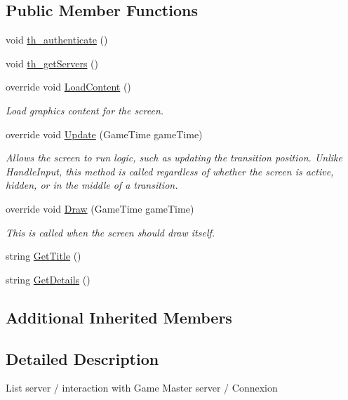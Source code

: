 \subsection*{Public Member Functions}
\begin{DoxyCompactItemize}
\item 
void \hyperlink{classgearit_1_1src_1_1gui_1_1_menu_play_a28597c13b8d65ca1c8ca39fb51b44cec}{th\+\_\+authenticate} ()
\item 
void \hyperlink{classgearit_1_1src_1_1gui_1_1_menu_play_ab941e76740981fb4c6da8fe7bb173134}{th\+\_\+get\+Servers} ()
\item 
override void \hyperlink{classgearit_1_1src_1_1gui_1_1_menu_play_af910914479191ff3c5df9a9371a508dd}{Load\+Content} ()
\begin{DoxyCompactList}\small\item\em Load graphics content for the screen. \end{DoxyCompactList}\item 
override void \hyperlink{classgearit_1_1src_1_1gui_1_1_menu_play_a81c6b64878420e9905deec6038b1804f}{Update} (Game\+Time game\+Time)
\begin{DoxyCompactList}\small\item\em Allows the screen to run logic, such as updating the transition position. Unlike Handle\+Input, this method is called regardless of whether the screen is active, hidden, or in the middle of a transition. \end{DoxyCompactList}\item 
override void \hyperlink{classgearit_1_1src_1_1gui_1_1_menu_play_a5d930bebee9e40d7a74a6427bb028fc5}{Draw} (Game\+Time game\+Time)
\begin{DoxyCompactList}\small\item\em This is called when the screen should draw itself. \end{DoxyCompactList}\item 
string \hyperlink{classgearit_1_1src_1_1gui_1_1_menu_play_a02ce51245e638777e7736d474eead42b}{Get\+Title} ()
\item 
string \hyperlink{classgearit_1_1src_1_1gui_1_1_menu_play_ad1134c4aec4b65780d1b053b2a39e337}{Get\+Details} ()
\end{DoxyCompactItemize}
\subsection*{Additional Inherited Members}


\subsection{Detailed Description}
List server / interaction with Game Master server / Connexion 



